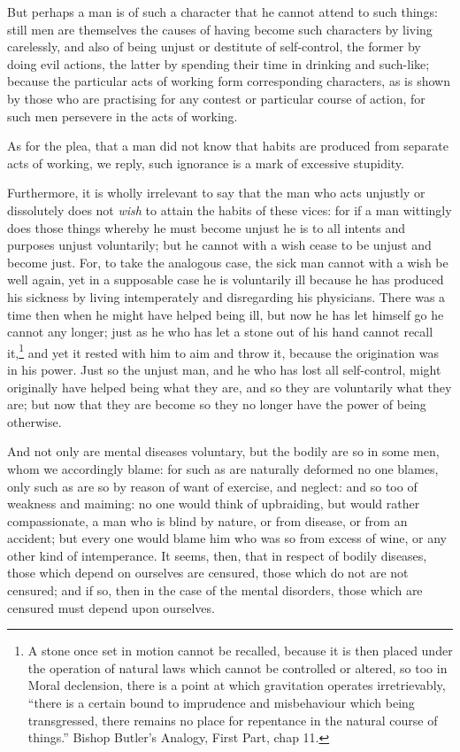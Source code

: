 But perhaps a man is of such a character that he cannot attend to such things:
still men are themselves the causes of having become such characters by living
carelessly, and also of being unjust or destitute of self-control, the former
by doing evil actions, the latter by spending their time in drinking and
such-like; because the particular acts of working form corresponding
characters, as is shown by those who are practising for any contest or
particular course of action, for such men persevere in the acts of working.

As for the plea, that a man did not know that habits are produced from separate
acts of working, we reply, such ignorance is a mark of excessive stupidity.

Furthermore, it is wholly irrelevant to say that the man who acts unjustly or
dissolutely does not \emph{wish} to attain the habits of these vices: for if a
man wittingly does those things whereby he must become unjust he is to all
intents and purposes unjust voluntarily; but he cannot with a wish cease to be
unjust and become just. For, to take the analogous case, the sick man cannot
with a wish be well again, yet in a supposable case he is voluntarily ill
because he has produced his sickness by living intemperately and disregarding
his physicians. There was a time then when he might have helped being ill, but
now he has let himself go he cannot any longer; just as he who has let a stone
out of his hand cannot recall it,\footnote{A stone once set in motion cannot be recalled, because it is then placed under
the operation of natural laws which cannot be controlled or altered, so too in
Moral declension, there is a point at which gravitation operates irretrievably,
“there is a certain bound to imprudence and misbehaviour which being
transgressed, there remains no place for repentance in the natural course of
things.” Bishop Butler’s Analogy, First Part, chap 11.}
and yet it rested with him to aim and throw it, because the origination was in
his power. Just so the unjust man, and he who has lost all self-control, might
originally have helped being what they are, and so they are voluntarily what
they are; but now that they are become so they no longer have the power of
being otherwise.

And not only are mental diseases voluntary, but the bodily are so in some men,
whom we accordingly blame: for such as are naturally deformed no one blames,
only such as are so by reason of want of exercise, and neglect: and so too of
weakness and maiming: no one would think of upbraiding, but would rather
compassionate, a man who is blind by nature, or from disease, or from an
accident; but every one would blame him who was so from excess of wine, or any
other kind of intemperance. It seems, then, that in respect of bodily diseases,
those which depend on ourselves are censured, those which do not are not
censured; and if so, then in the case of the mental disorders, those which are
censured must depend upon ourselves.

